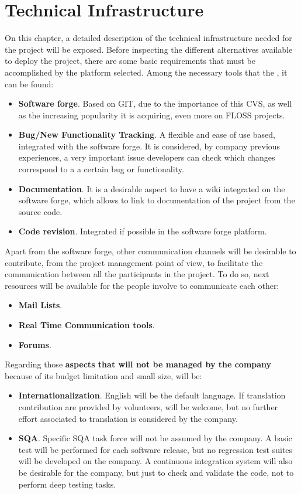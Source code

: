 \documentclass[11pt]{article}
\begin{document}
\section{Technical Infrastructure}
On this chapter, a detailed description of the technical infrastructure needed for the project will be exposed. Before inspecting the different alternatives available to deploy the project, there are some basic requirements that must be accomplished by the platform selected. Among the necessary tools that the , it can be found:
\begin{itemize}\itemsep0pt
\item{\textbf{Software forge}}. Based on GIT, due to the importance of this CVS, as well as the increasing popularity it is acquiring, even more on FLOSS projects.
\item{\textbf{Bug/New Functionality Tracking}}. A flexible and ease of use based, integrated with the software forge. It is considered, by company previous experiences, a very important issue developers can check which changes correspond to a a certain bug or functionality.
\item{\textbf{Documentation}}. It is a desirable aspect to have a wiki integrated on the software forge, which allows to link to documentation of the project from the source code.
\item{\textbf{Code revision}}. Integrated if possible in the software forge platform.
\end{itemize}
Apart from the software forge, other communication channels will be desirable to contribute, from the project management point of view, to facilitate the communication between all the participants in the project. To do so, next resources will be available for the people involve to communicate each other:
\begin{itemize}\itemsep0pt
\item{\textbf{Mail Lists}}.
\item{\textbf{Real Time Communication tools}}. 
\item{\textbf{Forums}}.
\end{itemize}
Regarding those \textbf{aspects that will not be managed by the company} because of its budget limitation and small size, will be:
\begin{itemize}\itemsep0pt
\item{\textbf{Internationalization}}. English will be the default language. If translation contribution are provided by volunteers, will be welcome, but no further effort associated to translation is considered by the company.
\item{\textbf{SQA}}. Specific SQA task force will not be assumed by the company. A basic test will be performed for each software release, but no regression test suites will be developed on the company. A continuous integration system will also be desirable for the company, but just to check and validate the code, not to perform deep testing tasks.
\end{itemize}
\end{document}

